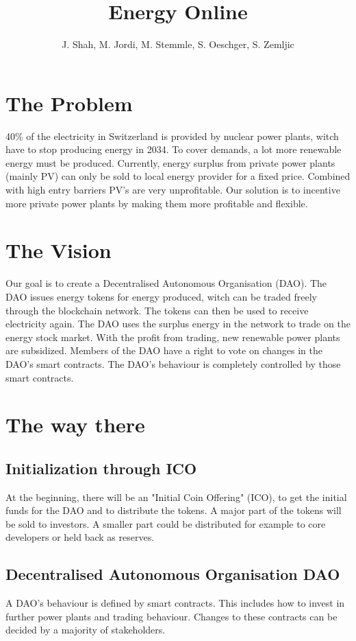 \documentclass{scrartcl}
\begin{document}
	
	\title{Energy Online}
	\subtitle{}
	\author{J. Shah, M. Jordi, M. Stemmle, S. Oeschger, S. Zemljic}
	
	\maketitle
	
	\section{The Problem}
	
	40\% of the electricity in Switzerland is provided by nuclear power plants, witch have to stop producing energy in 2034. To cover demands, a lot more renewable energy must be produced. 
	Currently, energy surplus from private power plants (mainly PV) can only be sold to local energy provider for a fixed price. Combined with high entry barriers PV's are very unprofitable.
	Our solution is to incentive more private power plants by making them more profitable and flexible.
	
	\section{The Vision}
	
	Our goal is to create a Decentralised Autonomous Organisation (DAO). The DAO issues energy tokens for energy produced, witch can be traded freely through the blockchain network. The tokens can then be used to receive electricity again. The DAO uses the surplus energy in the network to trade on the energy stock market. With the profit from trading, new renewable power plants are subsidized. Members of the DAO have a right to vote on changes in the DAO's smart contracts. The DAO's behaviour is completely controlled by those smart contracts.  
	
	\section{The way there}
	
	\subsection{Initialization through ICO}
	At the beginning, there will be an "Initial Coin Offering" (ICO), to get the initial funds for the DAO and to distribute the tokens. A major part of the tokens will be sold to investors. A smaller part could be distributed for example to core developers or held back as reserves. 
	
	\subsection{Decentralised Autonomous Organisation DAO}
	A DAO's behaviour is defined by smart contracts. This includes how to invest in further power plants  and trading behaviour. Changes to these contracts can be decided by a majority of stakeholders. 
	
	
\end{document}
